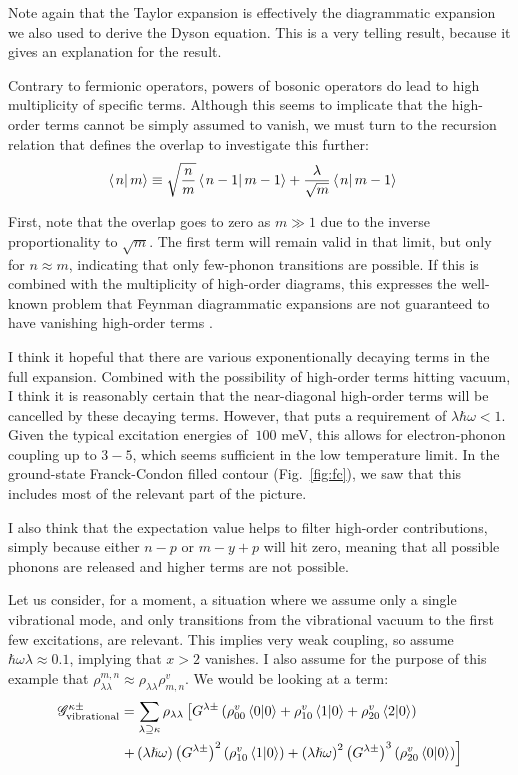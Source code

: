Note again that the Taylor expansion is effectively the diagrammatic expansion we also used to derive the Dyson equation. This is a very telling result, because it gives an explanation for the result.

Contrary to fermionic operators, powers of bosonic operators do lead to high multiplicity of specific terms. Although this seems to implicate that the high-order terms cannot be simply assumed to vanish, we must turn to the recursion relation that defines the overlap to investigate this further:
\begin{align*}
\braket{\left. n\right|m} &\equiv \sqrt{\frac{n}{m}} \braket{\left. n-1\right|m-1} + \frac{\lambda}{\sqrt{m}} \braket{\left. n\right|m-1}
\end{align*}

First, note that the overlap goes to zero as $m\gg 1$ due to the inverse proportionality to $\sqrt{m}$. The first term will remain valid in that limit, but only for $n\approx m$, indicating that only few-phonon transitions are possible. If this is combined with the multiplicity of high-order diagrams, this expresses the well-known problem that Feynman diagrammatic expansions are not guaranteed to have vanishing high-order terms \cite{mattuck}.

I think it hopeful that there are various exponentionally decaying terms in the full expansion. Combined with the possibility of high-order terms hitting vacuum, I think it is reasonably certain that the near-diagonal high-order terms will be cancelled by these decaying terms. However, that puts a requirement of $ \lambda \hbar \omega < 1$. Given the typical excitation energies of $~100$ meV, this allows for electron-phonon coupling up to $3-5$, which seems sufficient in the low temperature limit. In the ground-state Franck-Condon filled contour (Fig.~\ref{fig:fc}), we saw that this includes most of the relevant part of the picture.

I also think that the expectation value helps to filter high-order contributions, simply because either $n-p$ or $m-y+p$ will hit zero, meaning that all possible phonons are released and higher terms are not possible. 

Let us consider, for a moment, a situation where we assume only a single vibrational mode, and only transitions from the vibrational vacuum to the first few excitations, are relevant. This implies very weak coupling, so assume $\hbar \omega \lambda \approx 0.1$, implying that $x>2$ vanishes. I also assume for the purpose of this example that $\rho^{m,n}_{\lambda\lambda} \approx \rho_{\lambda\lambda} \rho^v_{m,n}$. We would be looking at a term:
\begin{align*}
\mathscr{G}^{\kappa\pm}_\text{vibrational} &= \sum_{\lambda\supseteq \kappa} \rho_{\lambda \lambda} \left[ G^{\lambda\pm} \left( \rho_{00}^v \braket{0|0} + \rho_{10}^v \braket{1|0} + \rho_{20}^v\braket{2|0}\right) \right. \\ &\left.+ \left(\lambda\hslash\omega\right)\left(G^{\lambda\pm}\right)^2 \left(\rho_{10}^v \braket{1|0}\right) + \left(\lambda\hslash\omega\right)^2 \left(G^{\lambda\pm}\right)^3 \left( \rho_{20}^v \braket{0|0}\right) \right]
\end{align*}

